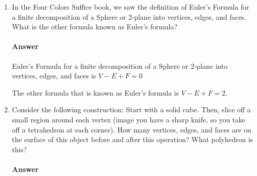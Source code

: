 \documentclass{article}
\begin{document}
\begin{enumerate}

    \item In the Four Colors Suffice book, we saw the definition of Euler's
        Formula for a finite decomposition of a Sphere or 2-plane into vertices,
        edges, and faces.  What is the other formula known as Euler's formula?

        \paragraph{Answer}

        Euler's Formula for a finite decomposition of a Sphere or 2-plane into
        vertices, edges, and faces is $V-E+F=0$

        The other formula that is known as Euler's formula is $V-E+F=2$.


    \item  Consider the following construction: Start with a solid cube.  Then, slice
        off a small region around each vertex (image you have a sharp knife, so you take
        off a tetrahedron at each corner).  How many vertices, edges, and faces are on
        the surface of this object before and after this operation? What polyhedron is this?

        \paragraph{Answer}


\end{enumerate}
\end{document}
